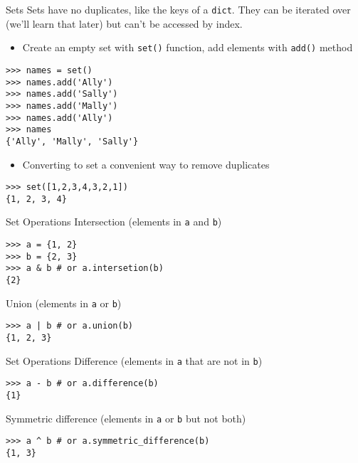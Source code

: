 \documentclass[smaller, aspectratio=1610]{beamer}
\begin{document}
\begin{frame}[label={sec:org3b44587},fragile]{Sets}
 Sets have no duplicates, like the keys of a \texttt{dict}. They can be iterated
over (we'll learn that later) but can't be accessed by index.

\begin{itemize}
\item Create an empty set with \texttt{set()} function, add elements with \texttt{add()} method
\end{itemize}

\lstset{language=Python,label= ,caption= ,captionpos=b,numbers=none}
\begin{lstlisting}
>>> names = set()
>>> names.add('Ally')
>>> names.add('Sally')
>>> names.add('Mally')
>>> names.add('Ally')
>>> names
{'Ally', 'Mally', 'Sally'}
\end{lstlisting}

\begin{itemize}
\item Converting to set a convenient way to remove duplicates
\end{itemize}

\lstset{language=Python,label= ,caption= ,captionpos=b,numbers=none}
\begin{lstlisting}
>>> set([1,2,3,4,3,2,1])
{1, 2, 3, 4}
\end{lstlisting}
\end{frame}

\begin{frame}[label={sec:orgda4821b},fragile]{Set Operations}
 Intersection (elements in \texttt{a} \alert{and} \texttt{b})

\lstset{language=Python,label= ,caption= ,captionpos=b,numbers=none}
\begin{lstlisting}
>>> a = {1, 2}
>>> b = {2, 3}
>>> a & b # or a.intersetion(b)
{2}
\end{lstlisting}

Union (elements in \texttt{a} \alert{or} \texttt{b})

\lstset{language=Python,label= ,caption= ,captionpos=b,numbers=none}
\begin{lstlisting}
>>> a | b # or a.union(b)
{1, 2, 3}
\end{lstlisting}
\end{frame}

\begin{frame}[label={sec:org75ce0ae},fragile]{Set Operations}
 Difference (elements in \texttt{a} that are not in \texttt{b})

\lstset{language=Python,label= ,caption= ,captionpos=b,numbers=none}
\begin{lstlisting}
>>> a - b # or a.difference(b)
{1}
\end{lstlisting}

Symmetric difference (elements in \texttt{a} or \texttt{b} but not both)

\lstset{language=Python,label= ,caption= ,captionpos=b,numbers=none}
\begin{lstlisting}
>>> a ^ b # or a.symmetric_difference(b)
{1, 3}
\end{lstlisting}
\end{frame}
\end{document}
